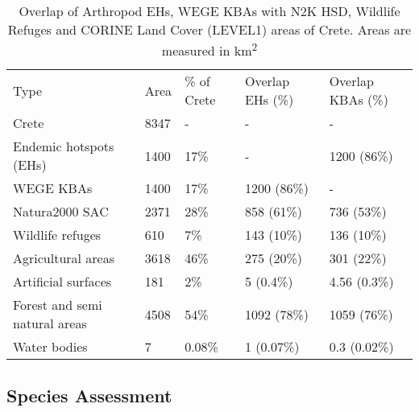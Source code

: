 \begin{table}[]
\caption{Overlap of Arthropod EHs, WEGE KBAs with N2K HSD, Wildlife Refuges and CORINE Land Cover (LEVEL1) areas of Crete. Areas are measured in km\textsuperscript{2}}
\begin{tabular}{lllll}
Type                          & Area       & \% of Crete & Overlap EHs (\%)                          & Overlap KBAs (\%)                  \\
Crete                         & 8347       & -           & -                                      & -                               \\
Endemic hotspots (EHs)        & 1400       & 17\%        & -                                      & 1200 (86\%)                     \\
WEGE KBAs                     & 1400       & 17\%        & 1200 (86\%)                            & -                               \\
Natura2000 SAC                & 2371       & 28\%        & 858 (61\%)                             & 736 (53\%)                      \\
Wildlife refuges              & 610        & 7\%         & 143 (10\%)                             & 136 (10\%)                      \\
Agricultural areas            & 3618       & 46\%        & 275 (20\%)                             & 301 (22\%)                      \\
Artificial surfaces           & 181        & 2\%         & 5 (0.4\%)                              & 4.56 (0.3\%)                    \\
Forest and semi natural areas & 4508       & 54\%        & 1092 (78\%)                            & 1059 (76\%)                     \\
Water bodies                  & 7          & 0.08\%      & 1 (0.07\%)                             & 0.3 (0.02\%)                   
\end{tabular}
\label{arthropods-overlaps}
\end{table}


    \subsection{Species Assessment}
    \label{subsec:arthropods-species-assessment}
    
